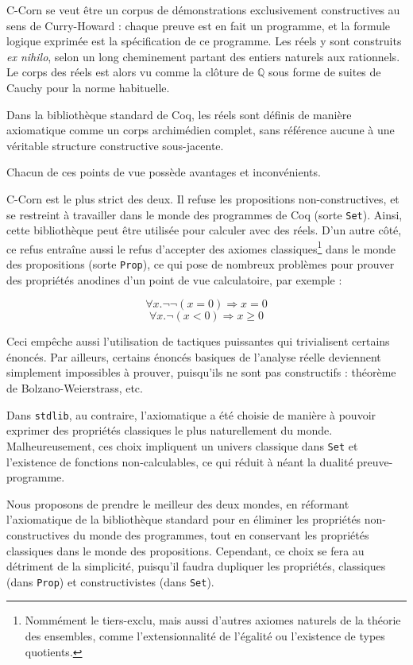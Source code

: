 \documentclass[11pt]{article}
\begin{document}
C-Corn se veut être un corpus de démonstrations exclusivement constructives au sens de Curry-Howard : chaque preuve est en fait un programme, et la formule logique exprimée est la spécification de ce programme. Les réels y sont construits \emph{ex nihilo}, selon un long cheminement partant des entiers naturels aux rationnels. Le corps des réels est alors vu comme la clôture de $\mathbb{Q}$ sous forme de suites de Cauchy pour la norme habituelle.

Dans la bibliothèque standard de Coq, les réels sont définis de manière axiomatique comme un corps archimédien complet, sans référence aucune à une véritable structure constructive sous-jacente.

Chacun de ces points de vue possède avantages et inconvénients.

C-Corn est le plus strict des deux. Il refuse les propositions non-constructives, et se restreint à travailler dans le monde des programmes de Coq (sorte \texttt{Set}). Ainsi, cette bibliothèque peut être utilisée pour calculer avec des réels. D'un autre côté, ce refus entraîne aussi le refus d'accepter des axiomes classiques\footnote{Nommément le tiers-exclu, mais aussi d'autres axiomes naturels de la théorie des ensembles, comme l'extensionnalité de l'égalité ou l'existence de types quotients.} dans le monde des propositions (sorte \texttt{Prop}), ce qui pose de nombreux problèmes pour prouver des propriétés anodines d'un point de vue calculatoire, par exemple :

$$\forall x.\neg\neg(x = 0) \Rightarrow x = 0$$
$$\forall x.\neg(x < 0) \Rightarrow x \geq 0$$

Ceci empêche aussi l'utilisation de tactiques puissantes qui trivialisent certains énoncés. Par ailleurs, certains énoncés basiques de l'analyse réelle deviennent simplement impossibles à prouver, puisqu'ils ne sont pas constructifs : théorème de Bolzano-Weierstrass, etc.

Dans \texttt{stdlib}, au contraire, l'axiomatique a été choisie de manière à pouvoir exprimer des propriétés classiques le plus naturellement du monde. Malheureusement, ces choix impliquent un univers classique dans \texttt{Set} et l'existence de fonctions non-calculables, ce qui réduit à néant la dualité preuve-programme.

\bigskip
Nous proposons de prendre le meilleur des deux mondes, en réformant l'axiomatique de la bibliothèque standard pour en éliminer les propriétés non-constructives du monde des programmes, tout en conservant les propriétés classiques dans le monde des propositions. Cependant, ce choix se fera au détriment de la simplicité, puisqu'il faudra dupliquer les propriétés, classiques (dans \texttt{Prop}) et constructivistes (dans \texttt{Set}).
\end{document}
